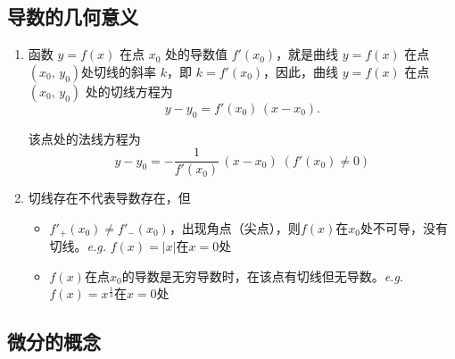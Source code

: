 \documentclass[../book.tex]{subfiles}
\begin{document}
    \subsection{导数的几何意义}

    \begin{enumerate}
        \item 函数 $y=f(x)$ 在点 $x_0$ 处的导数值 $f'(x_0)$，就是曲线 $y=f(x)$ 在点 $(x_0,\,y_0)$处切线的斜率 $k$，即 $k = f'(x_0)$，因此，曲线 $y=f(x)$ 在点 $(x_0,\,y_0)$ 处的切线方程为
        \[
            y - y_0 = f'(x_0)\,(x - x_0).
        \]

        该点处的法线方程为
        \[
            y - y_0 = -\frac{1}{f'(x_0)}\,(x - x_0) \; (f'(x_0) \neq 0)
        \]
        \item 切线存在不代表导数存在，但{\color{red}{导数存在切线一定存在}}
        \begin{itemize}
            \item $f'_+(x_0) \neq f'_-(x_0)$，出现角点（尖点），则$f(x)$在$x_0$处不可导，没有切线。\emph{e.g.} $f(x) = |x|$在$x = 0$处
            \item $f(x)$在点$x_0$的导数是无穷导数时，在该点有切线但无导数。\emph{e.g.} $f(x) = x^\frac{1}{3}$在$x = 0$处
        \end{itemize}
    \end{enumerate}

    \subsection{微分的概念}
\end{document}
